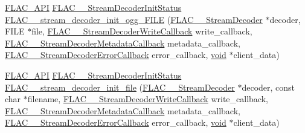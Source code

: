 \begin{DoxyCompactItemize}
\item 
\mbox{\hyperlink{group__flac__export_ga56ca07df8a23310707732b1c0007d6f5}{F\+L\+A\+C\+\_\+\+A\+PI}} \mbox{\hyperlink{group__flac__stream__decoder_gaaed54a24ac6310d29c5cafba79759c44}{F\+L\+A\+C\+\_\+\+\_\+\+Stream\+Decoder\+Init\+Status}} \mbox{\hyperlink{group__flac__stream__decoder_gac6a35b1db07e057ec9912f637b37dd74}{F\+L\+A\+C\+\_\+\+\_\+stream\+\_\+decoder\+\_\+init\+\_\+ogg\+\_\+\+F\+I\+LE}} (\mbox{\hyperlink{struct_f_l_a_c_____stream_decoder}{F\+L\+A\+C\+\_\+\+\_\+\+Stream\+Decoder}} $\ast$decoder, F\+I\+LE $\ast$file, \mbox{\hyperlink{group__flac__stream__decoder_ga61e48dc2c0d2f6c5519290ff046874a4}{F\+L\+A\+C\+\_\+\+\_\+\+Stream\+Decoder\+Write\+Callback}} write\+\_\+callback, \mbox{\hyperlink{group__flac__stream__decoder_ga6aa87c01744c1c601b7f371f627b6e14}{F\+L\+A\+C\+\_\+\+\_\+\+Stream\+Decoder\+Metadata\+Callback}} metadata\+\_\+callback, \mbox{\hyperlink{group__flac__stream__decoder_gac896ee6a12668e9015fab4fbc6aae996}{F\+L\+A\+C\+\_\+\+\_\+\+Stream\+Decoder\+Error\+Callback}} error\+\_\+callback, \mbox{\hyperlink{_s_d_l__opengles2__gl2ext_8h_ae5d8fa23ad07c48bb609509eae494c95}{void}} $\ast$client\+\_\+data)
\item 
\mbox{\hyperlink{group__flac__export_ga56ca07df8a23310707732b1c0007d6f5}{F\+L\+A\+C\+\_\+\+A\+PI}} \mbox{\hyperlink{group__flac__stream__decoder_gaaed54a24ac6310d29c5cafba79759c44}{F\+L\+A\+C\+\_\+\+\_\+\+Stream\+Decoder\+Init\+Status}} \mbox{\hyperlink{group__flac__stream__decoder_ga1692108a97012d1c5f79baf7df012c33}{F\+L\+A\+C\+\_\+\+\_\+stream\+\_\+decoder\+\_\+init\+\_\+file}} (\mbox{\hyperlink{struct_f_l_a_c_____stream_decoder}{F\+L\+A\+C\+\_\+\+\_\+\+Stream\+Decoder}} $\ast$decoder, const char $\ast$filename, \mbox{\hyperlink{group__flac__stream__decoder_ga61e48dc2c0d2f6c5519290ff046874a4}{F\+L\+A\+C\+\_\+\+\_\+\+Stream\+Decoder\+Write\+Callback}} write\+\_\+callback, \mbox{\hyperlink{group__flac__stream__decoder_ga6aa87c01744c1c601b7f371f627b6e14}{F\+L\+A\+C\+\_\+\+\_\+\+Stream\+Decoder\+Metadata\+Callback}} metadata\+\_\+callback, \mbox{\hyperlink{group__flac__stream__decoder_gac896ee6a12668e9015fab4fbc6aae996}{F\+L\+A\+C\+\_\+\+\_\+\+Stream\+Decoder\+Error\+Callback}} error\+\_\+callback, \mbox{\hyperlink{_s_d_l__opengles2__gl2ext_8h_ae5d8fa23ad07c48bb609509eae494c95}{void}} $\ast$client\+\_\+data)
\item 

\end{DoxyCompactItemize}

